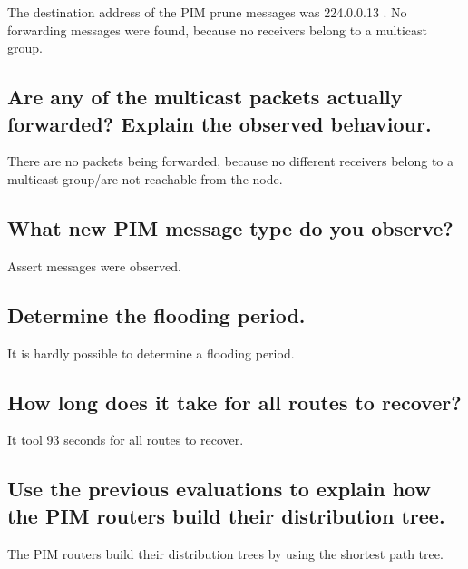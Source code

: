 \documentclass[a4paper, 11pt]{article}
\begin{document}
The destination address of the PIM prune messages was 224.0.0.13 . No forwarding messages were found, because no receivers belong to a multicast group.

\subsection{Are any of the multicast packets actually forwarded? Explain the observed behaviour.}

There are no packets being forwarded, because no different receivers belong to a multicast group/are not reachable from the node.

\subsection{What new PIM message type do you observe?}

Assert messages were observed.

\subsection{Determine the flooding period.}

It is hardly possible to determine a flooding period.

\subsection{How long does it take for all routes to recover?}

It tool 93 seconds for all routes to recover.

\subsection{Use the previous evaluations to explain how the PIM routers build their distribution tree.}

The PIM routers build their distribution trees by using the shortest path tree.
\end{document}
